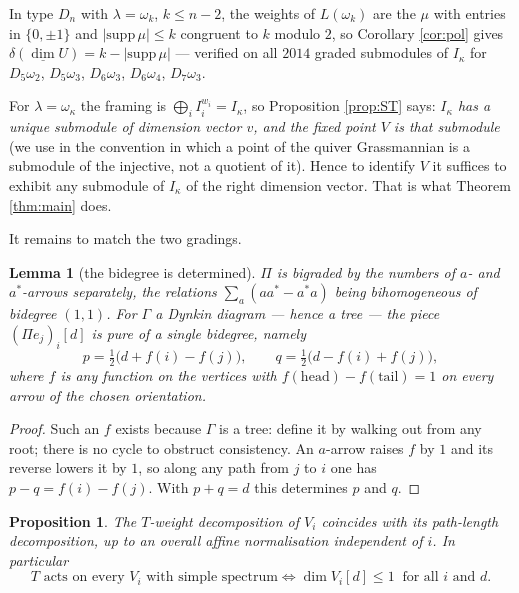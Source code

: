 \documentclass[11pt,reqno]{amsart}
\theoremstyle{plain}
\newtheorem{proposition}[theorem]{Proposition}
\newtheorem{lemma}[theorem]{Lemma}
\theoremstyle{definition}
\newcommand{\Pia}{\Pi}
\newcommand{\dimv}{\underline{\dim}}
\newcommand{\om}{\omega}
\newcommand{\la}{\lambda}
\newcommand{\ka}{\kappa}
\begin{document}
In type $D_n$ with $\la=\om_k$, $k\le n-2$, the weights of $L(\om_k)$ are the
$\mu$ with entries in $\{0,\pm1\}$ and $|\mathrm{supp}\,\mu|\le k$ congruent to
$k$ modulo $2$, so Corollary \ref{cor:pol} gives
$\delta(\dimv U)=k-|\mathrm{supp}\,\mu|$ --- verified on all $2014$ graded
submodules of $I_\ka$ for $D_5\om_2$, $D_5\om_3$, $D_6\om_3$, $D_6\om_4$,
$D_7\om_3$.

For $\la=\om_\ka$ the framing is $\bigoplus_i I_i^{w_i}=I_\ka$, so
Proposition \ref{prop:ST} says: \emph{$I_\ka$ has a unique submodule of
dimension vector $v$, and the fixed point $V$ is that submodule} (we use
\cite[Thm.~4.4]{ST} in the convention in which a point of the quiver
Grassmannian is a submodule of the injective, not a quotient of it).  Hence to
identify $V$ it suffices to exhibit any submodule of $I_\ka$ of the right
dimension vector.  That is what Theorem \ref{thm:main} does.

It remains to match the two gradings.

\begin{lemma}[the bidegree is determined]\label{lem:bigrade}
$\Pia$ is bigraded by the numbers of $a$- and $a^*$-arrows separately, the
relations $\sum_a(aa^*-a^*a)$ being bihomogeneous of bidegree $(1,1)$.  For
$\Gamma$ a Dynkin diagram --- hence a tree --- the piece $(\Pia e_j)_i[d]$ is
pure of a single bidegree, namely
\[
   p=\tfrac12\bigl(d+f(i)-f(j)\bigr),\qquad q=\tfrac12\bigl(d-f(i)+f(j)\bigr),
\]
where $f$ is any function on the vertices with $f(\mathrm{head})-
f(\mathrm{tail})=1$ on every arrow of the chosen orientation.
\end{lemma}

\begin{proof}
Such an $f$ exists because $\Gamma$ is a tree: define it by walking out from
any root; there is no cycle to obstruct consistency.  An $a$-arrow raises $f$
by $1$ and its reverse lowers it by $1$, so along any path from $j$ to $i$ one
has $p-q=f(i)-f(j)$.  With $p+q=d$ this determines $p$ and $q$.
\end{proof}

\begin{proposition}\label{prop:grading}
The $T$-weight decomposition of $V_i$ coincides with its path-length
decomposition, up to an overall affine normalisation independent of $i$.  In
particular
\[
   T \text{ acts on every } V_i \text{ with simple spectrum}
   \iff
   \dim V_i[d]\le 1 \ \text{ for all } i \text{ and } d .
\]
\end{proposition}
\end{document}
